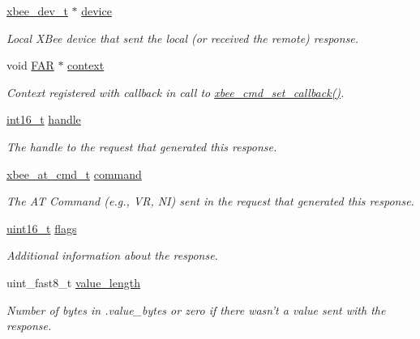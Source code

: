 \begin{DoxyCompactItemize}
\item 
\hyperlink{structxbee__dev__t}{xbee\-\_\-dev\-\_\-t} $\ast$ \hyperlink{structxbee__cmd__response__t_ac780e07a2b2cd8df18f56240588090c5}{device}
\begin{DoxyCompactList}\small\item\em Local X\-Bee device that sent the local (or received the remote) response. \end{DoxyCompactList}\item 
void \hyperlink{group__hal_gaef060b3456fdcc093a7210a762d5f2ed}{F\-A\-R} $\ast$ \hyperlink{structxbee__cmd__response__t_aa91f8e864e06077c354e5f5216547758}{context}
\begin{DoxyCompactList}\small\item\em Context registered with callback in call to \hyperlink{group__xbee__atcmd_ga0a5d2e2e87743061c46abd53e379e014}{xbee\-\_\-cmd\-\_\-set\-\_\-callback()}. \end{DoxyCompactList}\item 
\hyperlink{group__hal_ga2140805d08462d474b82ddc8d1c2f3e6}{int16\-\_\-t} \hyperlink{structxbee__cmd__response__t_a1542542d7a68344e5d31df924a254df4}{handle}
\begin{DoxyCompactList}\small\item\em The handle to the request that generated this response. \end{DoxyCompactList}\item 
\hyperlink{unionxbee__at__cmd__t}{xbee\-\_\-at\-\_\-cmd\-\_\-t} \hyperlink{structxbee__cmd__response__t_aa1e66c60bb56acaced6ca2646fd44616}{command}
\begin{DoxyCompactList}\small\item\em The A\-T Command (e.\-g., V\-R, N\-I) sent in the request that generated this response. \end{DoxyCompactList}\item 
\hyperlink{group__hal_ga5a8b2dc9e45a9ee81a94ef304fb62505}{uint16\-\_\-t} \hyperlink{structxbee__cmd__response__t_a1e87af3c18a2fd36c61faf89949bdc3f}{flags}
\begin{DoxyCompactList}\small\item\em Additional information about the response. \end{DoxyCompactList}\item 
uint\-\_\-fast8\-\_\-t \hyperlink{structxbee__cmd__response__t_a2c54a515e67816a5056c4526e22a91d9}{value\-\_\-length}
\begin{DoxyCompactList}\small\item\em Number of bytes in .value\-\_\-bytes or zero if there wasn't a value sent with the response. \end{DoxyCompactList}\item 

\end{DoxyCompactItemize}
